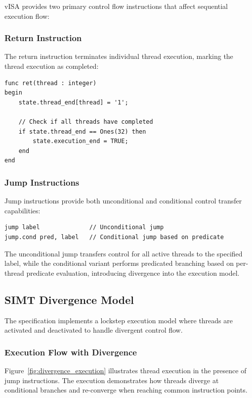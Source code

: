 vISA provides two primary control flow instructions that affect sequential execution flow:

\subsubsection{Return Instruction}
The return instruction terminates individual thread execution, marking the
thread execution as completed:

\begin{lstlisting}[caption={Return Instruction Implementation}, label={lst:return_impl}]
func ret(thread : integer)
begin
    state.thread_end[thread] = '1';
    
    // Check if all threads have completed
    if state.thread_end == Ones(32) then
        state.execution_end = TRUE;
    end
end
\end{lstlisting}

\subsubsection{Jump Instructions}
Jump instructions provide both unconditional and conditional control transfer
capabilities:

\begin{lstlisting}[caption={Jump Instruction Syntax}]
jump label              // Unconditional jump
jump.cond pred, label   // Conditional jump based on predicate
\end{lstlisting}

The unconditional jump transfers control for all active threads to the
specified label, while the conditional variant performs predicated branching
based on per-thread predicate evaluation, introducing divergence into the
execution model.

\subsection{SIMT Divergence Model}
\label{subsec:divergence_model}

The specification implements a lockstep execution model where threads are
activated and deactivated to handle divergent control flow.

\subsubsection{Execution Flow with Divergence}
Figure~\ref{fig:divergence_execution} illustrates thread execution in the
presence of jump instructions. The execution demonstrates how threads diverge
at conditional branches and re-converge when reaching common instruction
points.

